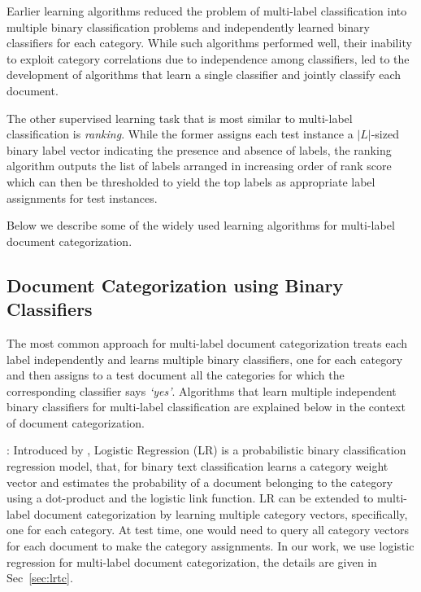 Earlier learning algorithms reduced the problem of multi-label 
classification into multiple binary classification problems and 
independently learned binary classifiers for each category. While 
such algorithms performed well, their inability to exploit category 
correlations due to independence among classifiers, led to the 
development of algorithms that learn a single classifier and jointly classify each document. 

The other supervised learning task that is most similar to
multi-label classification is \emph{ranking}. While the former assigns 
each test instance a $|L|$-sized binary label vector indicating the 
presence and absence of labels, the ranking algorithm outputs the list 
of labels arranged in increasing order of rank score which 
can then be thresholded to yield the top labels as 
appropriate label assignments for test instances.

Below we describe some of the widely used learning algorithms for multi-label document categorization. 

\subsection{Document Categorization using Binary Classifiers}
\label{sec:rw_multiple_classifiers}
The most common approach for multi-label document categorization treats 
each label independently and learns multiple binary classifiers, one 
for each category and then assigns to a test document all the 
categories for which the corresponding classifier says \emph{`yes'}. 
Algorithms that learn multiple independent binary classifiers for 
multi-label classification are explained below in the context of document 
categorization.

 : Introduced by \citet{hosmer1989applied}, 
Logistic Regression (LR) is a probabilistic binary classification 
regression model, that, for binary text classification learns a 
category weight vector and estimates the probability of a document 
belonging to the category using a dot-product and the logistic link 
function. LR can be extended to multi-label document categorization 
by learning multiple category vectors, specifically, one for each 
category. At test time, one would need to query all category vectors 
for each document to make the category assignments. In our work, we 
use logistic regression for multi-label document categorization, the 
details are given in Sec~\ref{sec:lrtc}.

